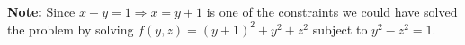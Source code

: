 
\textbf{Note:} Since $x - y = 1 \Rightarrow x = y + 1$ is one of the constraints we could have solved the problem by solving $f(y, z) = (y + 1)^2 + y^2 + z^2$ subject to $y^2 - z^2 = 1$.